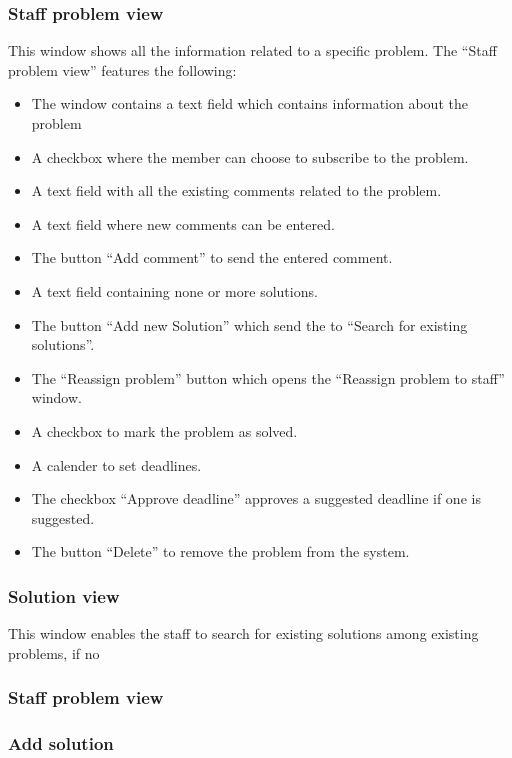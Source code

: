 \subsubsection{Staff problem view}
This window shows all the information related to a specific problem. 
The ``Staff problem view'' features the following:
\begin{itemize}
	\item The window contains a text field which contains information about the problem
	\item A checkbox where the \astaff member can choose to subscribe to the problem.
	\item A text field with all the existing comments related to the problem.
	\item A text field where new comments can be entered.
	\item The button ``Add comment'' to send the entered comment.
	\item A text field containing none or more solutions.
	\item The button ``Add new Solution'' which send the \astaff[] to ``Search for existing solutions''.  
	\item The ``Reassign problem'' button which opens the ``Reassign problem to staff'' window.
	\item A checkbox to mark the problem as solved.
	\item A calender to set deadlines.
	\item The checkbox ``Approve deadline'' approves a suggested deadline if one is suggested.
	\item The button ``Delete'' to remove the problem from the system. 
\end{itemize}

\subsubsection{Solution view}
This window enables the staff to search for existing solutions among existing problems, if no 
\subsubsection{Staff problem view}




\subsubsection{Add solution}

